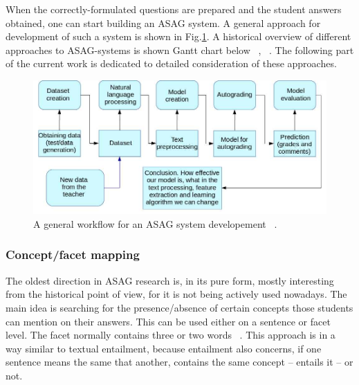 When the correctly-formulated questions are prepared and the student answers obtained, one can start building an ASAG system. A general approach for development of such a system is shown in Fig.\ref{fig:workflowEN}. A historical overview of different approaches to ASAG-systems is shown Gantt chart below ~\cite{Hasanah}, ~\cite{Burrows}. The following part of the current work is dedicated to detailed consideration of these approaches.\\

\begin{figure}[h!]
  \centering
  \includegraphics[width=1.0\textwidth]{img/workflowEN}
    \caption{A general workflow for an ASAG system developement ~\cite{Burrows}.\label{fig:workflowEN}}
\end{figure}

\begin{preview}
\centering
{}
  \begin{gantt}{6}{10}
    \begin{ganttitle}
    \end{ganttitle}
  \end{gantt}
\end{preview}

\subsubsection{Concept/facet mapping}

The oldest direction in ASAG research is, in its pure form, mostly interesting from the historical point of view, for it is not being actively used nowadays. The main idea is searching for the presence/absence of certain concepts those students can mention on their answers. This can be used either on a sentence or facet level. The facet normally contains three or two words ~\cite{Burrows}. This approach is in a way similar to textual entailment, because entailment also concerns, if one sentence means the same that another, contains the same concept -- entails it -- or not.\\

